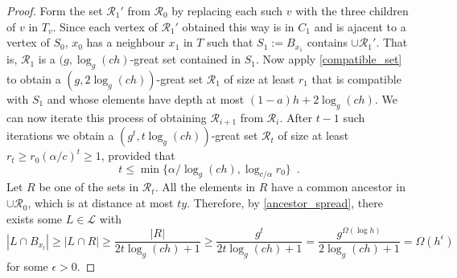 \documentclass{patmorin}
\newcommand{\defin}[1]{\emph{\color{brightmaroon}#1}}
\DeclareMathOperator{\dist}{dist}
\DeclareMathOperator{\diam}{diam}
\begin{document}
\begin{proof}
  Form the set $\mathcal{R}_1'$ from $\mathcal{R}_0$ by replacing each such $v$ with the three children of $v$ in $T_v$.   Since each vertex of $\mathcal{R}_1'$ obtained this way is in $C_1$ and is ajacent to a vertex of $S_0$, $x_0$ has a neighbour $x_1$ in $T$ such that $S_1:=B_{x_1}$ contains $\cup\mathcal{R}_1'$.  That is, $\mathcal{R}_1$ is a $(g,\log_g(ch)$-great set contained in $S_1$.  Now apply \cref{compatible_set} to obtain a $(g,2\log_g(ch))$-great set $\mathcal{R}_1$ of size at least $r_1$ that is compatible with $S_1$ and whose elements have depth at most $(1-a)h+2\log_g(ch)$.  We can now iterate this process of obtaining $\mathcal{R}_{i+1}$ from $\mathcal{R}_i$.  After $t-1$ such iterations we obtain a $(g^t,t\log_g(ch))$-great set $\mathcal{R}_t$ of size at least $r_t \ge r_0(\alpha/c)^t \ge 1$, provided that 
  \[
    t \le \min\{\alpha/\log_g(ch), \log_{c/\alpha} r_0\} \enspace .
  \]
  Let $R$ be one of the sets in $\mathcal{R}_t$.  All the elements in $R$ have a common ancestor in $\cup\mathcal{R}_0$, which is at distance at most $ty$.  Therefore, by \cref{ancestor_spread}, there exists some $L\in\mathcal{L}$ with
  \[
    |L\cap B_{x_t}|\ge |L\cap R| \ge \frac{|R|}{2t\log_g(ch)+1} 
    \ge \frac{g^t}{2t\log_g(ch)+1}
    = \frac{g^{\Omega(\log h)}}{2\log_g(ch)+1}
    = \Omega(h^\epsilon) 
  \] 
  for some $\epsilon >0$.
\end{proof}




\end{document}
